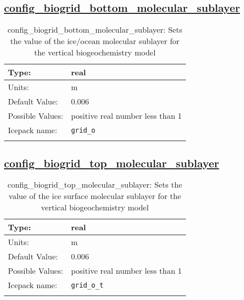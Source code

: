\subsection[config\_biogrid\_bottom\_molecular\_sublayer]{\hyperref[sec:nm_tab_biogeochemistry]{config\_biogrid\_bottom\_molecular\_sublayer}}
\label{subsec:nm_sec_config_biogrid_bottom_molecular_sublayer}
\begin{center}
\begin{longtable}{| p{2.0in} || p{4.0in} |}
    \hline
    Type: & real \\
    \hline
    Units: & \si{m} \\
    \hline
    Default Value: & 0.006 \\
    \hline
    Possible Values: & positive real number less than 1 \\
    \hline
    \hline
    Icepack name: & \verb+grid_o+ \\
    \caption{config\_biogrid\_bottom\_molecular\_sublayer: Sets the value of the ice/ocean molecular sublayer for the vertical biogeochemistry model}
\end{longtable}
\end{center}
\subsection[config\_biogrid\_top\_molecular\_sublayer]{\hyperref[sec:nm_tab_biogeochemistry]{config\_biogrid\_top\_molecular\_sublayer}}
\label{subsec:nm_sec_config_biogrid_top_molecular_sublayer}
\begin{center}
\begin{longtable}{| p{2.0in} || p{4.0in} |}
    \hline
    Type: & real \\
    \hline
    Units: & \si{m} \\
    \hline
    Default Value: & 0.006 \\
    \hline
    Possible Values: & positive real number less than 1 \\
    \hline
    \hline
    Icepack name: & \verb+grid_o_t+ \\
    \caption{config\_biogrid\_top\_molecular\_sublayer: Sets the value of the ice surface molecular sublayer for the vertical biogeochemistry model}
\end{longtable}
\end{center}
